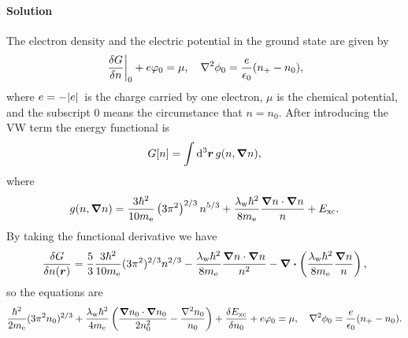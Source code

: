 \documentclass[hyperref, a4paper]{article}
\begin{document}
\paragraph{Solution} The electron density and the electric potential in the ground state are given by 
\begin{equation}
    \eval{\fdv{G}{n}}_0 + e \varphi_0 = \mu, \quad \laplacian \phi_0 = \frac{e}{\epsilon_0} (n_+ - n_0),
\end{equation}
where $e = - \abs*{e}$ is the charge carried by one electron, $\mu$ is the chemical potential, and the subscript 0 means the circumstance that $n = n_0$.
After introducing the VW term the energy functional is 
\begin{equation}
    G[n] = \int \dd[3]{\vb*{r}} g(n, \grad{n}), 
\end{equation}
where 
\begin{equation}
    g(n, \grad{n}) = \frac{3 \hbar^{2}}{10 m_\text{e}}\left(3 \pi^{2}\right)^{2 / 3} n^{5 / 3}+\frac{\lambda_{\mathrm{w}} \hbar^{2}}{8 m_\text{e}} \frac{\grad n \cdot \grad n}{n}+E_{\mathrm{xc}}.
\end{equation}
By taking the functional derivative we have 
\[
    \fdv{G}{n(\vb*{r})} = \frac{5}{3} \frac{3 \hbar^2}{10 m_\text{e}} (3\pi^2)^{2/3} n^{2/3} - \frac{\lambda_\text{w} \hbar^2}{8 m_\text{e}} \frac{\grad{n} \cdot \grad{n}}{n^2} - \div\left( \frac{\lambda_{\mathrm{w}} \hbar^{2}}{8 m_\text{e}} \frac{\grad{n}}{n} \right) ,
\]
so the equations are 
\begin{equation}
    \frac{\hbar^2}{2 m_\text{e}} (3\pi^2 n_0)^{2/3} + \frac{\lambda_{\mathrm{w}} \hbar^{2}}{4 m_\text{e}}\left( \frac{\grad n_0 \cdot \grad n_0}{2 n_0^{2}}-\frac{\nabla^{2} n_0}{n_0} \right)+\frac{\delta E_{\mathrm{xc}}}{\delta n_0} + e \varphi_0 = \mu, \quad \laplacian \phi_0 = \frac{e}{\epsilon_0} (n_+ - n_0).
\end{equation}
\end{document}

